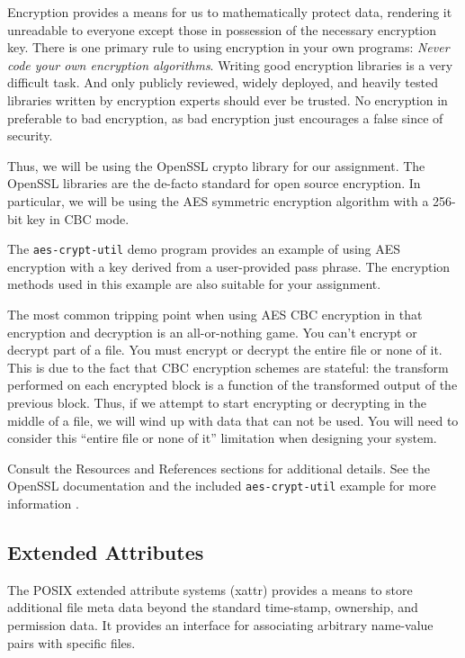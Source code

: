 \documentclass[12pt]{article}
\begin{document}
Encryption provides a means for us to mathematically protect data,
rendering it unreadable to everyone except those in possession of the
necessary encryption key. There is one primary rule to using
encryption in your own programs: \emph{Never code your own encryption
 algorithms}. Writing good encryption libraries is a very difficult
task. And only publicly reviewed, widely deployed, and heavily tested
libraries written by encryption experts should ever be trusted. No
encryption in preferable to bad encryption, as bad encryption just
encourages a false since of security.

Thus, we will be using the OpenSSL\cite{openssl-website} crypto
library\cite{openssl-evp} for our
assignment. The OpenSSL libraries are the de-facto standard for open
source encryption. In particular, we will be using the AES symmetric
encryption algorithm with a 256-bit key in CBC mode.

The \texttt{aes-crypt-util} demo program provides an example of using
AES encryption with a key derived from a user-provided pass phrase. The
encryption methods used in this example are also suitable for your
assignment.

The most common tripping point when using AES CBC
encryption in that encryption and decryption is an all-or-nothing
game. You can't encrypt or decrypt part of a file. You must encrypt or
decrypt the entire file or none of it. This is due to the fact that CBC
encryption schemes are stateful: the transform performed on each
encrypted block is a function of the transformed output of the previous
block. Thus, if we attempt to start encrypting or decrypting in
the middle of a file, we will wind up with data that can not be
used. You will need to consider this ``entire file or none of it''
limitation when designing your system.

Consult the Resources and References sections for additional
details. See the OpenSSL documentation and the included
\texttt{aes-crypt-util} example for more information
\cite{openssl-website,openssl-docs,openssl-evp,pillai-aes}.

\subsection{Extended Attributes}

The POSIX extended attribute systems (xattr) provides a means to
store additional file meta data beyond the standard time-stamp,
ownership, and permission data. It provides an interface for
associating arbitrary name-value pairs with specific files.
\end{document}
